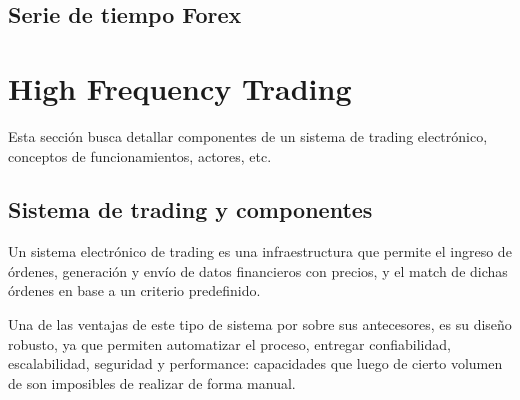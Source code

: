 
\subsection{Serie de tiempo Forex}

\section{High Frequency Trading}

Esta sección busca detallar componentes de un sistema de trading electrónico, 
conceptos de funcionamientos, actores, etc.

\subsection{Sistema de trading y componentes}
Un sistema electrónico de trading es una infraestructura que permite el ingreso
de órdenes, generación y envío de datos financieros con precios, y el match de
dichas órdenes en base a un criterio predefinido.

Una de las ventajas de este tipo de sistema por sobre sus antecesores, es su
diseño robusto, ya que permiten automatizar el proceso, entregar confiabilidad,
escalabilidad, seguridad y performance: capacidades que luego de cierto volumen
de son imposibles de realizar de forma manual.

